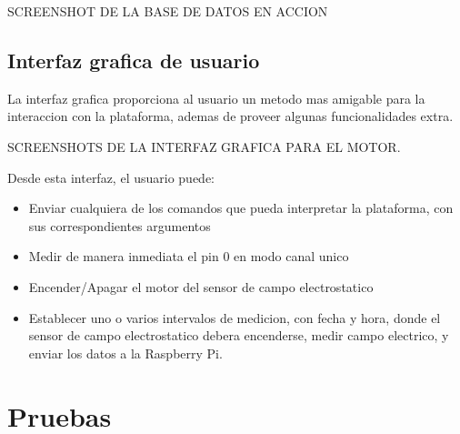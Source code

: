 SCREENSHOT DE LA BASE DE DATOS EN ACCION


\subsection{Interfaz grafica de usuario} %
\label{it7:sub:interfaz_grafica_de_usuario}

La interfaz grafica proporciona al usuario un metodo mas amigable para la interaccion con la plataforma, ademas de proveer algunas funcionalidades extra.

SCREENSHOTS DE LA INTERFAZ GRAFICA PARA EL MOTOR.

Desde esta interfaz, el usuario puede:

\begin{itemize}
  \item Enviar cualquiera de los comandos que pueda interpretar la plataforma, con sus correspondientes argumentos
  \item Medir de manera inmediata el pin 0 en modo canal unico
  \item Encender/Apagar el motor del sensor de campo electrostatico
  \item Establecer uno o varios intervalos de medicion, con fecha y hora, donde el sensor de campo electrostatico debera encenderse, medir campo electrico, y enviar los datos a la Raspberry Pi.
\end{itemize}




\section{Pruebas} %
\label{it7:sec:pruebas}

